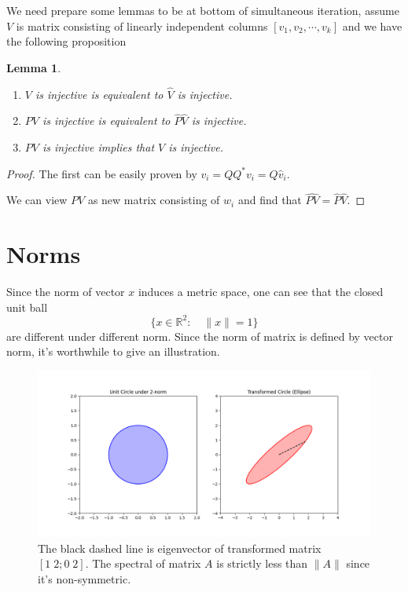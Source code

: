 \documentclass[dvipsnames, 12pt]{article}
\newtheorem{Lemma}[Theorem]{Lemma}
\begin{document}
We need prepare some lemmas to be at bottom of simultaneous iteration, assume $V$ is matrix consisting of linearly independent columns $[v_{1}, v_{2}, \cdots, v_{k}]$ and we have the following proposition
\begin{Lemma}
\begin{enumerate}
    \item $V$ is injective is equivalent to $\widehat{V}$ is injective.
    
    \item $PV$ is injective is equivalent to $\widehat{P}\widehat{V}$ is injective.
    
    \item $PV$ is injective implies that $V$ is injective.
\end{enumerate}
    
\end{Lemma}

\begin{proof}
    The first can be easily proven by $v_{i} = Q Q^{*} v_{i} = Q\widehat{v}_{i}$. 

    We can view $PV$ as new matrix consisting of $w_{i}$ and find that $\widehat{PV} = \widehat{P} \widehat{V}$.
\end{proof}




\newpage
\section{Norms}
Since the norm of vector $x$ induces a metric space, one can see that the closed unit ball 
$$
\{x\in \mathbb{R}^{2}:\quad \|x\| = 1\}
$$
are different under different norm. Since the norm of matrix is defined by vector norm, it's worthwhile to give an illustration.

\begin{figure}[ht]
    \centering
    \includegraphics[width=1.0\linewidth]{illustrations/matrix_norm.png}
    \caption{The black dashed line is eigenvector of transformed matrix $[1 \;2; 0 \;2]$. The spectral of matrix $A$ is strictly less than $\|A\|$ since it's non-symmetric.}
    \label{fig:enter-label}
\end{figure}
\end{document}
